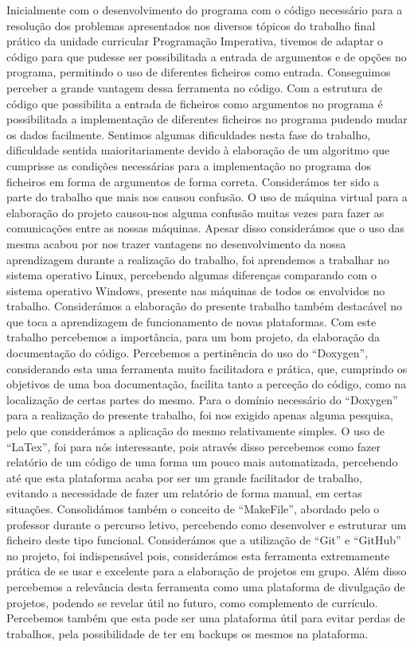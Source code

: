 \documentclass[a4wide]{report}
\begin{document}
{{{{Inicialmente com o desenvolvimento do programa com o código necessário para a resolução dos problemas apresentados nos diversos tópicos do trabalho final prático da unidade curricular Programação Imperativa, tivemos de adaptar o código para que pudesse ser possibilitada a entrada de argumentos e de opções no programa, permitindo o uso de diferentes ficheiros como entrada. Conseguimos perceber a grande vantagem dessa ferramenta no código. Com a estrutura de código que possibilita a entrada de ficheiros como argumentos no programa é possibilitada a implementação de diferentes ficheiros no programa pudendo mudar os dados facilmente. Sentimos algumas dificuldades nesta fase do trabalho, dificuldade sentida maioritariamente devido à elaboração de um algoritmo que cumprisse as condições necessárias para a implementação no programa dos ficheiros em forma de argumentos de forma correta. Considerámos ter sido a parte do trabalho que mais nos causou confusão. O uso de máquina virtual para a elaboração do projeto causou-nos alguma confusão muitas vezes para fazer as comunicações entre as nossas máquinas. Apesar disso considerámos que o uso das mesma acabou por nos trazer vantagens no desenvolvimento da nossa aprendizagem durante a realização do trabalho, foi aprendemos a trabalhar no sistema operativo Linux, percebendo algumas diferenças comparando com o sistema operativo Windows, presente nas máquinas de todos os envolvidos no trabalho. Considerámos a elaboração do presente trabalho também destacável no que toca a aprendizagem de funcionamento de novas plataformas. Com este trabalho percebemos a importância, para um bom projeto, da elaboração da documentação do código. Percebemos a pertinência do uso do “Doxygen”, considerando esta uma ferramenta muito facilitadora e prática, que, cumprindo os objetivos de uma boa documentação, facilita tanto a perceção do código, como na localização de certas partes do mesmo. Para o domínio necessário do “Doxygen” para a realização do presente trabalho, foi nos exigido apenas alguma pesquisa, pelo que considerámos a aplicação do mesmo relativamente simples. O uso de “LaTex”, foi para nós interessante, pois através disso percebemos como fazer relatório de um código de uma forma um pouco mais automatizada, percebendo até que esta plataforma acaba por ser um grande facilitador de trabalho, evitando a necessidade de fazer um relatório de forma manual, em certas situações. Consolidámos também o conceito de “MakeFile”, abordado pelo o professor durante o percurso letivo, percebendo como desenvolver e estruturar um ficheiro deste tipo funcional. Considerámos que a utilização de “Git” e “GitHub” no projeto, foi indispensável pois, considerámos esta ferramenta extremamente prática de se usar e excelente para a elaboração de projetos em grupo. Além disso percebemos a relevância desta ferramenta como uma plataforma de divulgação de projetos, podendo se revelar útil no futuro, como complemento de currículo. Percebemos também que esta pode ser uma plataforma útil para evitar perdas de trabalhos, pela possibilidade de ter em backups os mesmos na plataforma.

}}}}
\end{document}
